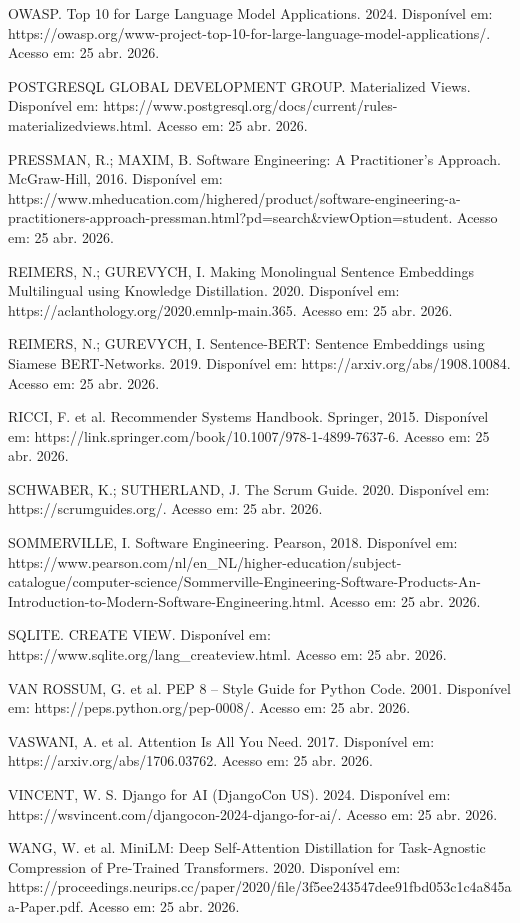 \documentclass[
]{article}
\begin{document}
OWASP. Top 10 for Large Language Model Applications. 2024. Disponível
em:
https://owasp.org/www-project-top-10-for-large-language-model-applications/.
Acesso em: 25 abr. 2026.

POSTGRESQL GLOBAL DEVELOPMENT GROUP. Materialized Views. Disponível em:
https://www.postgresql.org/docs/current/rules-materializedviews.html.
Acesso em: 25 abr. 2026.

PRESSMAN, R.; MAXIM, B. Software Engineering: A Practitioner's Approach.
McGraw-Hill, 2016. Disponível em:
https://www.mheducation.com/highered/product/software-engineering-a-practitioners-approach-pressman.html?pd=search\&viewOption=student.
Acesso em: 25 abr. 2026.

REIMERS, N.; GUREVYCH, I. Making Monolingual Sentence Embeddings
Multilingual using Knowledge Distillation. 2020. Disponível em:
https://aclanthology.org/2020.emnlp-main.365. Acesso em: 25 abr. 2026.

REIMERS, N.; GUREVYCH, I. Sentence-BERT: Sentence Embeddings using
Siamese BERT-Networks. 2019. Disponível em:
https://arxiv.org/abs/1908.10084. Acesso em: 25 abr. 2026.

RICCI, F. et al. Recommender Systems Handbook. Springer, 2015.
Disponível em: https://link.springer.com/book/10.1007/978-1-4899-7637-6.
Acesso em: 25 abr. 2026.

SCHWABER, K.; SUTHERLAND, J. The Scrum Guide. 2020. Disponível em:
https://scrumguides.org/. Acesso em: 25 abr. 2026.

SOMMERVILLE, I. Software Engineering. Pearson, 2018. Disponível em:
https://www.pearson.com/nl/en\_NL/higher-education/subject-catalogue/computer-science/Sommerville-Engineering-Software-Products-An-Introduction-to-Modern-Software-Engineering.html.
Acesso em: 25 abr. 2026.

SQLITE. CREATE VIEW. Disponível em:
https://www.sqlite.org/lang\_createview.html. Acesso em: 25 abr. 2026.

VAN ROSSUM, G. et al. PEP 8 -- Style Guide for Python Code. 2001.
Disponível em: https://peps.python.org/pep-0008/. Acesso em: 25 abr.
2026.

VASWANI, A. et al. Attention Is All You Need. 2017. Disponível em:
https://arxiv.org/abs/1706.03762. Acesso em: 25 abr. 2026.

VINCENT, W. S. Django for AI (DjangoCon US). 2024. Disponível em:
https://wsvincent.com/djangocon-2024-django-for-ai/. Acesso em: 25 abr.
2026.

WANG, W. et al. MiniLM: Deep Self-Attention Distillation for
Task-Agnostic Compression of Pre-Trained Transformers. 2020. Disponível
em:
https://proceedings.neurips.cc/paper/2020/file/3f5ee243547dee91fbd053c1c4a845aa-Paper.pdf.
Acesso em: 25 abr. 2026.
\end{document}
